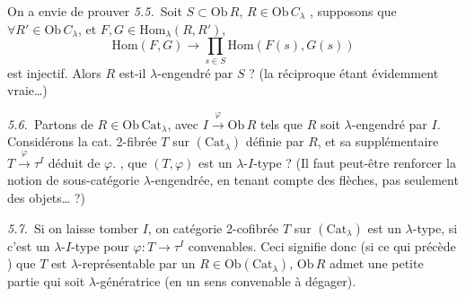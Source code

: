 \documentclass[11pt,a4paper]{article}
\begin{document}
On a envie de prouver \emph{5.5.}\ Soit $S \subset
\mathrm{Ob}\,R$, $R \in \mathrm{Ob}\,C_{\lambda}$ , supposons que $\forall R' \in \mathrm{Ob}\,
C_{\lambda}$, et $F, G \in \mathrm{Hom}_{\lambda}(R, R')$,
\[
  \mathrm{Hom}(F, G) \longrightarrow \prod_{s \in S}
  \mathrm{Hom}(F(s), G(s))
\]
est injectif. Alors $R$ est-il $\lambda$-engendré par $S$ ? (la
réciproque étant évidemment vraie…)


\emph{5.6.}\ Partons de $R \in \mathrm{Ob}\,\mathrm{Cat}_{\lambda}$,
avec $I \xrightarrow{\ \varphi\ } \mathrm{Ob}\,R$ tels que $R$ soit
$\lambda$-engendré par $I$. Considérons la cat. 2-\struck{\ill{}}fibrée
$T$ sur $(\mathrm{Cat}_{\lambda})$ définie par $R$, et sa 
supplémentaire $T \xrightarrow{\ \varphi\ } \tau^{I}$ déduit
de $\varphi$. , que $(T, \varphi)$ est un
$\lambda$-$I$-type ? (Il faut peut-être renforcer la notion de
sous-catégorie $\lambda$-engendrée, en tenant compte des flèches, pas
seulement des objets… ?)

\emph{5.7.}\ Si on laisse tomber $I$, on \struck{\ill{}}  catégorie
2-cofibrée $T$ sur $(\mathrm{Cat}_{\lambda})$ est un $\lambda$-type, si
c'est un $\lambda$-$I$-type pour  $\varphi : T \to \tau^{I}$
convenables. Ceci signifie donc (si ce qui précède
\struck{\ill{}} ) que $T$ est $\lambda$-représentable par un $R \in
\mathrm{Ob}(\mathrm{Cat}_{\lambda})$, 
$\mathrm{Ob}\,R$ admet une petite partie qui soit $\lambda$-génératrice
(en un sens convenable à dégager).
\end{document}
